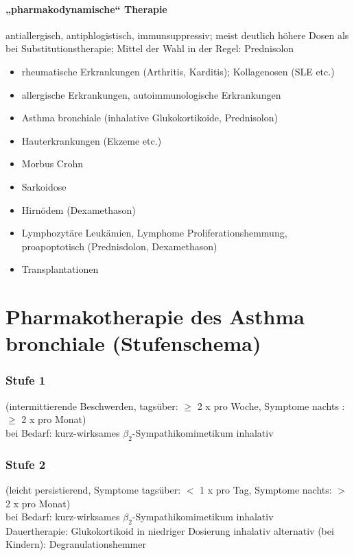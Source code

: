 \documentclass[10pt,a4paper]{report}
\begin{document}
\paragraph{„pharmakodynamische“ Therapie} %
\label{subp:_pharmakodynamische_therapie}
antiallergisch, antiphlogistisch, immunsuppressiv; meist deutlich höhere Dosen als bei Substitutionstherapie; Mittel der Wahl in der Regel: Prednisolon 
\begin{itemize}
	\item rheumatische Erkrankungen (Arthritis, Karditis);   Kollagenosen (SLE etc.)
	\item allergische Erkrankungen, autoimmunologische Erkrankungen
	\item Asthma bronchiale (inhalative Glukokortikoide, Prednisolon)
	\item Hauterkrankungen (Ekzeme etc.) 
	\item Morbus Crohn
	\item Sarkoidose
	\item Hirnödem (Dexamethason)
	\item Lymphozytäre Leukämien, Lymphome 
	Proliferationshemmung, proapoptotisch (Prednisdolon, Dexamethason)
	\item Transplantationen
\end{itemize}
\section{ Pharmakotherapie des Asthma bronchiale (Stufenschema)} %
\label{sec:_pharmakotherapie_des_asthma_bronchiale_stufenschema_}
\subsubsection{Stufe 1} %
\label{par:stufe_1}
(intermittierende Beschwerden, tagsüber: $\geq$ 2 x pro Woche, Symptome nachts :$\geq$ 2 x pro Monat)\\
bei Bedarf: kurz-wirksames $\beta_2$-Sympathikomimetikum inhalativ 	
\subsubsection{Stufe 2} %
\label{par:stufe_2}
(leicht persistierend, Symptome tagsüber: $<$ 1 x pro Tag, Symptome nachts: $>$ 2 x pro Monat)\\
bei Bedarf:	kurz-wirksames $\beta_2$-Sympathikomimetikum inhalativ 	\\
Dauertherapie: Glukokortikoid in niedriger Dosierung inhalativ alternativ (bei Kindern): Degranulationshemmer 
\end{document}
